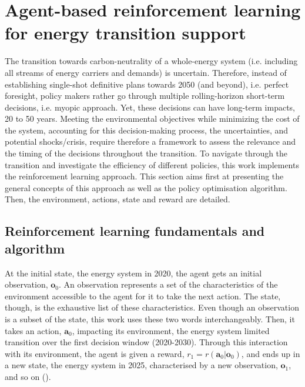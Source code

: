 \section{Agent-based reinforcement learning for energy transition support}
\label{sec:meth:RL}


The transition towards carbon-neutrality of a whole-energy system (i.e. including all streams of energy carriers and demands) is uncertain. Therefore, instead of establishing single-shot definitive plans towards 2050 (and beyond), i.e. perfect foresight, policy makers rather go through multiple rolling-horizon short-term decisions, i.e. myopic approach. Yet, these decisions can have long-term impacts, 20 to 50 years. Meeting the environmental objectives while minimizing the cost of the system, accounting for this decision-making process, the uncertainties, and potential shocks/crisis, require therefore a framework to assess the relevance and the timing of the decisions throughout the transition. To navigate through the transition and investigate the efficiency of different policies, this work implements the reinforcement learning approach. This section aims first at presenting the general concepts of this approach as well as the policy optimisation algorithm. Then, the environment, actions, state and reward are detailed.

\subsection{Reinforcement learning fundamentals and algorithm}
\label{subsec:meth_RL_fund_algo}
At the initial state, \ie the energy system in 2020, the agent gets an initial observation, $\bm{o}_0$. An observation represents a set of the characteristics of the environment accessible to the agent for it to take the next action. The state, though, is the exhaustive list of these characteristics. Even though an observation is a subset of the state, this work uses these two words interchangeably. Then, it takes an action, $\bm{a}_0$, impacting its environment, \ie the energy system limited transition over the first decision window (2020-2030). Through this interaction with its environment, the agent is given a reward, $r_1=r\left(\bm{a}_0 | \bm{o}_0 \right)$, and ends up in a new state, \ie the energy system in 2025, characterised by a new observation, $\bm{o}_1$, and so on ().


